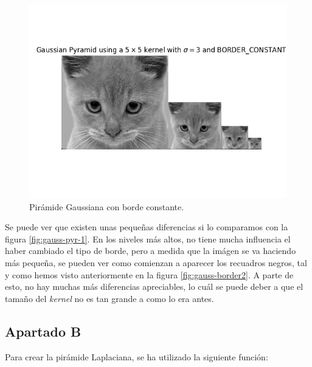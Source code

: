 \documentclass[11pt,a4paper]{article}
\begin{document}
\begin{figure}[H]
\centering
\includegraphics[scale=0.6]{img/gauss-pyr-2.png}
\caption{Pirámide Gaussiana con borde constante.}
\label{fig:gauss-pyr-2}
\end{figure}

Se puede ver que existen unas pequeñas diferencias si lo comparamos con la figura \ref{fig:gauss-pyr-1}. En los niveles
más altos, no tiene mucha influencia el haber cambiado el tipo de borde, pero a medida que la imágen se va haciendo más pequeña,
se pueden ver como comienzan a aparecer los recuadros negros, tal y como hemos visto anteriormente en la figura
\ref{fig:gauss-border2}. A parte de esto, no hay muchas más diferencias apreciables, lo cuál se puede deber a
que el tamaño del \textit{kernel} no es tan grande a como lo era antes.

\subsection{Apartado B}

Para crear la pirámide Laplaciana, se ha utilizado la siguiente función:
\end{document}
